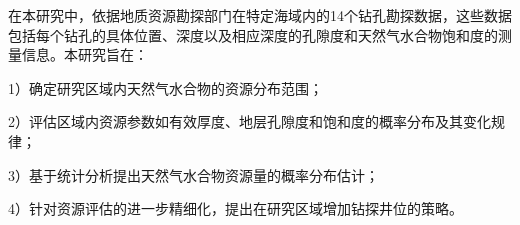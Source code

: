 
\setlength{\parindent}{2em} 
在本研究中，依据地质资源勘探部门在特定海域内的14个钻孔勘探数据，这些数据包括每个钻孔的具体位置、深度以及相应深度的孔隙度和天然气水合物饱和度的测量信息。本研究旨在：

1）确定研究区域内天然气水合物的资源分布范围；

2）评估区域内资源参数如有效厚度、地层孔隙度和饱和度的概率分布及其变化规律；

3）基于统计分析提出天然气水合物资源量的概率分布估计；

4）针对资源评估的进一步精细化，提出在研究区域增加钻探井位的策略。